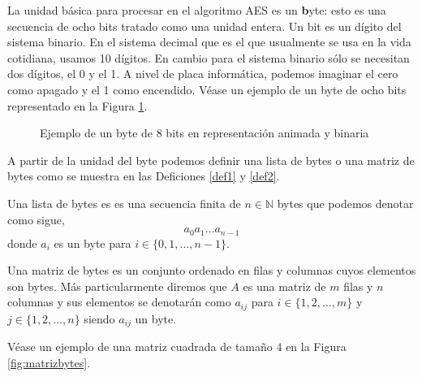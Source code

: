 La unidad básica para procesar en el algoritmo AES es un {\textbf byte}: esto es una secuencia de ocho bits tratado como una unidad entera. Un bit es un dígito del sistema binario. En el sistema decimal que es el que usualmente se usa en la vida cotidiana, usamos 10 dígitos. En cambio para el sistema binario sólo se necesitan dos dígitos, el 0 y el 1. A nivel de placa informática, podemos imaginar el cero como apagado y el 1 como encendido. Véase un ejemplo de un byte de ocho bits representado  en la Figura \ref{fig:byte}.
\begin{figure}[!ht]
\begin{figurebox}
\begin{center}
\end{center}\caption{Ejemplo de un byte de 8 bits en representación animada y binaria}\label{fig:byte}
\end{figurebox}
\end{figure}


 A partir de la unidad del byte podemos definir una lista de bytes o una matriz de bytes como se muestra en las Deficiones \ref{def1} y \ref{def2}.
\begin{definition}\label{def1}
Una lista de bytes es es una secuencia finita de $n\in \mathbb{N}$ bytes que podemos denotar como sigue,
$$a_0 a_1 ...a_{n-1}$$
donde $a_{i}$ es un byte para $i \in \{0,1,...,n-1\}$.
\end{definition}

\begin{definition}\label{def2}
Una matriz de bytes es un conjunto ordenado en filas y columnas cuyos elementos son bytes. Más particularmente diremos que $A$ es una matriz de $m$ filas y $n$ columnas y sus elementos se denotarán como  $a_{ij}$ para $i \in \{1,2,\dots, m\}$ y $j \in \{1,2,\dots, n\}$ siendo $a_{ij}$ un byte.
\end{definition}
Véase un ejemplo de una matriz cuadrada de tamaño $4$ en la Figura \ref{fig:matrizbytes}.

